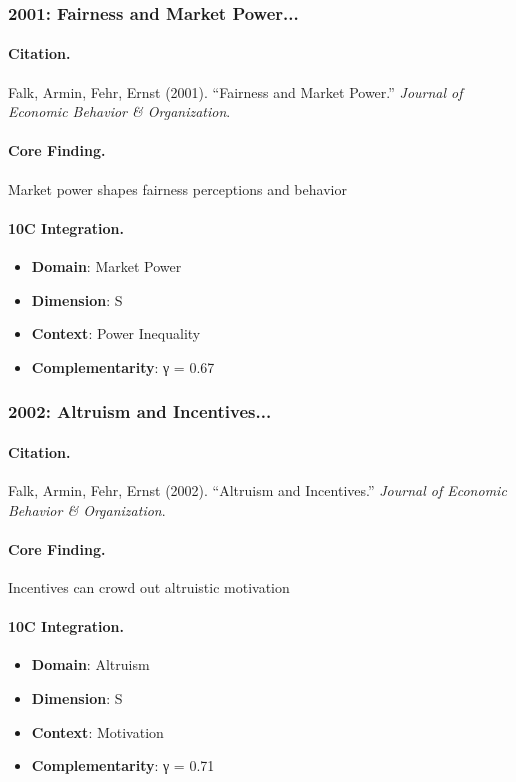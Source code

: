 \subsubsection{2001: Fairness and Market Power...}

\paragraph{Citation.}
Falk, Armin, Fehr, Ernst (2001). ``Fairness and Market Power.''
\textit{Journal of Economic Behavior & Organization}.

\paragraph{Core Finding.}
Market power shapes fairness perceptions and behavior

\paragraph{10C Integration.}
\begin{itemize}[nosep]
  \item \textbf{Domain}: Market Power
  \item \textbf{Dimension}: S
  \item \textbf{Context}: Power Inequality
  \item \textbf{Complementarity}: γ = 0.67
\end{itemize}


\subsubsection{2002: Altruism and Incentives...}

\paragraph{Citation.}
Falk, Armin, Fehr, Ernst (2002). ``Altruism and Incentives.''
\textit{Journal of Economic Behavior & Organization}.

\paragraph{Core Finding.}
Incentives can crowd out altruistic motivation

\paragraph{10C Integration.}
\begin{itemize}[nosep]
  \item \textbf{Domain}: Altruism
  \item \textbf{Dimension}: S
  \item \textbf{Context}: Motivation
  \item \textbf{Complementarity}: γ = 0.71
\end{itemize}


